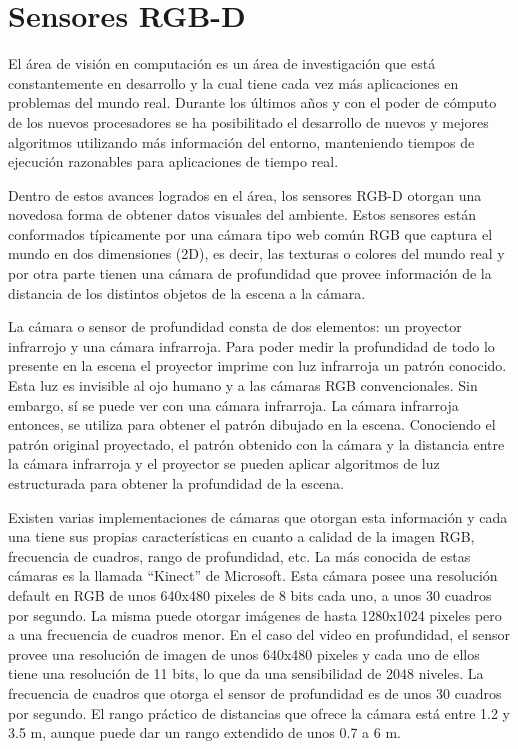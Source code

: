 \chapter{Sensores RGB-D}
El área de visión en computación es un área de investigación que está constantemente en desarrollo y la cual tiene cada vez más aplicaciones en problemas del mundo real. Durante los últimos años y con el poder de cómputo de los nuevos procesadores se ha posibilitado el desarrollo de nuevos y mejores algoritmos utilizando más información del entorno, manteniendo tiempos de ejecución razonables para aplicaciones de tiempo real.

Dentro de estos avances logrados en el área, los sensores RGB-D otorgan una novedosa forma de obtener datos visuales del ambiente. Estos sensores están conformados típicamente por una cámara tipo web común RGB que captura el mundo en dos dimensiones (2D), es decir, las texturas o colores del mundo real y por otra parte tienen una cámara de profundidad que provee información de la distancia de los distintos objetos de la escena a la cámara.

La cámara o sensor de profundidad consta de dos elementos: un proyector infrarrojo y una cámara infrarroja. Para poder medir la profundidad de todo lo presente en la escena el proyector imprime con luz infrarroja un patrón conocido. Esta luz es invisible al ojo humano y a las cámaras RGB convencionales. Sin embargo, sí se puede ver con una cámara infrarroja. La cámara infrarroja entonces, se utiliza para obtener el patrón dibujado en la escena. Conociendo el patrón original proyectado, el patrón obtenido con la cámara y la distancia entre la cámara infrarroja y el proyector se pueden aplicar algoritmos de luz estructurada para obtener la profundidad de la escena.

Existen varias implementaciones de cámaras que otorgan esta información y cada una tiene sus propias características en cuanto a calidad de la imagen RGB, frecuencia de cuadros, rango de profundidad, etc. La más conocida de estas cámaras es la llamada ``Kinect'' de Microsoft. Esta cámara posee una resolución default en RGB de unos 640x480 pixeles de 8 bits cada uno, a unos 30 cuadros por segundo. La misma puede otorgar imágenes de hasta 1280x1024 pixeles pero a una frecuencia de cuadros menor. En el caso del video en profundidad, el sensor provee una resolución de imagen de unos 640x480 pixeles y cada uno de ellos tiene una resolución de 11 bits, lo que da una sensibilidad de 2048 niveles. La frecuencia de cuadros que otorga el sensor de profundidad es de unos 30 cuadros por segundo. El rango práctico de distancias que ofrece la cámara está entre 1.2 y 3.5 m, aunque puede dar un rango extendido de unos 0.7 a 6 m.

